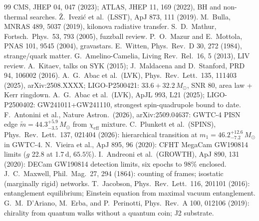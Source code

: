 \documentclass[11pt]{article}
\begin{document}
\begin{thebibliography}{99}
 CMS, JHEP 04, 047 (2023); ATLAS, JHEP 11, 169 (2022), BH and non-thermal searches.
 \v{Z}.~Ivezi\'c et al.\ (LSST), ApJ 873, 111 (2019).
 M.~Bulla, MNRAS 489, 5037 (2019), kilonova radiative transfer.
 S.~D.~Mathur, Fortsch.\ Phys.\ 53, 793 (2005), fuzzball review.
 P.~O.~Mazur and E.~Mottola, PNAS 101, 9545 (2004), gravastars.
 E.~Witten, Phys.\ Rev.\ D 30, 272 (1984), strange/quark matter.
 G.~Amelino-Camelia, Living Rev.\ Rel.\ 16, 5 (2013), LIV review.
 A.~Kitaev, talks on SYK (2015); J.~Maldacena and D.~Stanford, PRD 94, 106002 (2016).
 A.~G.~Abac et al.\ (LVK), Phys.\ Rev.\ Lett.\ 135, 111403 (2025), arXiv:2508.XXXX; LIGO-P2500421: $33.6+32.2\,M_\odot$, SNR 80, area law + Kerr ringdown.
 A.~G.~Abac et al.\ (LVK), ApJL 993, L21 (2025); LIGO-P2500402: GW241011+GW241110, strongest spin-quadrupole bound to date.
 F.~Antonini et al., Nature Astron.\ (2026), arXiv:2509.04637: GWTC-4 PISN edge $\tilde{m} = 44.3^{+5.9}_{-3.5}\,M_\odot$ from $\chi_{\mathrm{eff}}$ mixture.
 C.~Plunkett et al.\ (SPINS), Phys.\ Rev.\ Lett.\ 137, 021404 (2026): hierarchical transition at $m_1 = 46.2^{+12.6}_{-7.2}\,M_\odot$ in GWTC-4.
 N.~Vieira et al., ApJ 895, 96 (2020): CFHT MegaCam GW190814 limits ($g$ 22.8 at 1.7\,d, $65.5\%$).
 I.~Andreoni et al.\ (GROWTH), ApJ 890, 131 (2020): DECam GW190814 detection limits, six epochs to $98\%$ enclosed.
 J.~C.~Maxwell, Phil.\ Mag.\ 27, 294 (1864): counting of frames; isostatic (marginally rigid) networks.
 T.~Jacobson, Phys.\ Rev.\ Lett.\ 116, 201101 (2016): entanglement equilibrium; Einstein equation from maximal vacuum entanglement.
 G.~M.~D'Ariano, M.~Erba, and P.~Perinotti, Phys.\ Rev.\ A 100, 012106 (2019): chirality from quantum walks without a quantum coin; J2 substrate.
\end{thebibliography}
\end{document}

